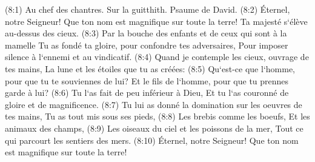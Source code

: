 \verse (8:1) Au chef des chantres. Sur la guitthith. Psaume de David. (8:2) Éternel, notre Seigneur! Que ton nom est magnifique sur toute la terre! Ta majesté s`élève au-dessus des cieux. 
\verse (8:3) Par la bouche des enfants et de ceux qui sont à la mamelle Tu as fondé ta gloire, pour confondre tes adversaires, Pour imposer silence à l`ennemi et au vindicatif. 
\verse (8:4) Quand je contemple les cieux, ouvrage de tes mains, La lune et les étoiles que tu as créées: 
\verse (8:5) Qu`est-ce que l`homme, pour que tu te souviennes de lui? Et le fils de l`homme, pour que tu prennes garde à lui? 
\verse (8:6) Tu l`as fait de peu inférieur à Dieu, Et tu l`as couronné de gloire et de magnificence. 
\verse (8:7) Tu lui as donné la domination sur les oeuvres de tes mains, Tu as tout mis sous ses pieds, 
\verse (8:8) Les brebis comme les boeufs, Et les animaux des champs, 
\verse (8:9) Les oiseaux du ciel et les poissons de la mer, Tout ce qui parcourt les sentiers des mers. 
\verse (8:10) Éternel, notre Seigneur! Que ton nom est magnifique sur toute la terre! 

\chapter{}


